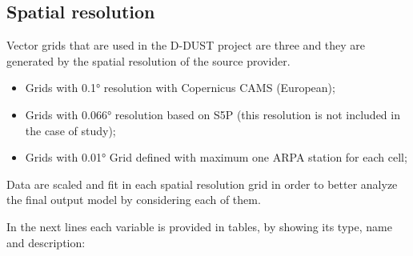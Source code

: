 \subsection{Spatial resolution}
Vector grids that are used in the D-DUST project are three and they are generated by the spatial resolution of the source provider. 

\begin{itemize}
\item Grids with 0.1° resolution with Copernicus CAMS (European);
\item Grids with 0.066° resolution based on S5P (this resolution is not included in the case of study);
\item Grids with 0.01° Grid defined with maximum one ARPA station for each cell;
\end{itemize}

Data are scaled and fit in each spatial resolution grid in order to better analyze the final output model by considering each of them.

In the next lines each variable is provided in tables, by showing its type, name and description:

